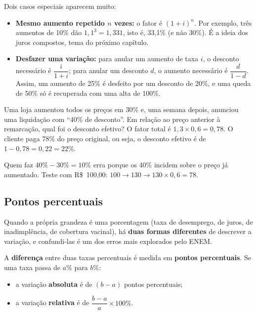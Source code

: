 Dois casos especiais aparecem muito:
\begin{itemize}[itemsep=2pt]
  \item \textbf{Mesmo aumento repetido $n$ vezes:} o fator é $(1+i)^n$. Por
    exemplo, três aumentos de 10\% dão $1{,}1^3 = 1{,}331$, isto é, 33,1\% (e não
    30\%). É a ideia dos juros compostos, tema do próximo capítulo.
  \item \textbf{Desfazer uma variação:} para anular um aumento de taxa $i$, o
    desconto necessário é $\dfrac{i}{1+i}$; para anular um desconto $d$, o aumento
    necessário é $\dfrac{d}{1-d}$. Assim, um aumento de 25\% é desfeito por um
    desconto de 20\%, e uma queda de 50\% só é recuperada com uma alta de 100\%.
\end{itemize}

\begin{exemplo}
Uma loja aumentou todos os preços em 30\% e, uma semana depois, anunciou uma
liquidação com ``40\% de desconto''. Em relação ao preço anterior à remarcação,
qual foi o desconto efetivo?
\solucao
O fator total é $1{,}3\times 0{,}6 = 0{,}78$. O cliente paga 78\% do preço
original, ou seja, o desconto efetivo é de $1-0{,}78 = 0{,}22 = 22\%$.

Quem faz $40\%-30\% = 10\%$ erra porque os 40\% incidem sobre o preço já
aumentado. Teste com R\$~100,00: $100\to 130\to 130\times 0{,}6 = 78$.
\end{exemplo}

\subsection{Pontos percentuais}

Quando a própria grandeza é uma porcentagem (taxa de desemprego, de juros, de
inadimplência, de cobertura vacinal), há \textbf{duas formas diferentes} de
descrever a variação, e confundi-las é um dos erros mais explorados pelo ENEM.

\begin{definicao}
A \textbf{diferença} entre duas taxas percentuais é medida em \textbf{pontos
percentuais}. Se uma taxa passa de $a\%$ para $b\%$:
\begin{itemize}[itemsep=1pt,topsep=2pt]
  \item a variação \textbf{absoluta} é de $(b-a)$ pontos percentuais;
  \item a variação \textbf{relativa} é de $\dfrac{b-a}{a}\times 100\%$.
\end{itemize}
\end{definicao}

